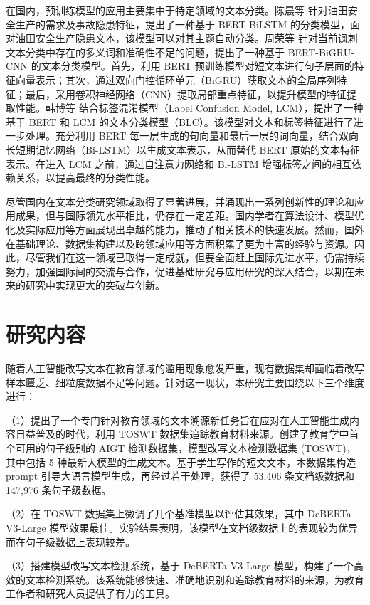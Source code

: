 在国内，预训练模型的应用主要集中于特定领域的文本分类。陈晨等 \cite{KXJS202429028} 针对油田安全生产的需求及事故隐患特征，提出了一种基于 BERT-BiLSTM 的分类模型，面对油田安全生产隐患文本，该模型可以对其主题自动分类。周荣等 \cite{DLXZ20240909001} 针对当前讽刺文本分类中存在的多义词和准确性不足的问题，提出了一种基于 BERT-BiGRU-CNN 的文本分类模型。首先，利用 BERT 预训练模型对短文本进行句子层面的特征向量表示；其次，通过双向门控循环单元（BiGRU）获取文本的全局序列特征；最后，采用卷积神经网络（CNN）提取局部重点特征，以提升模型的特征提取性能。韩博等 \cite{NJYD202403012} 结合标签混淆模型（Label Confusion Model, LCM），提出了一种基于 BERT 和 LCM 的文本分类模型（BLC）。该模型对文本和标签特征进行了进一步处理。充分利用 BERT 每一层生成的句向量和最后一层的词向量，结合双向长短期记忆网络（Bi-LSTM）以生成文本表示，从而替代 BERT 原始的文本特征表示。在进入 LCM 之前，通过自注意力网络和 Bi-LSTM 增强标签之间的相互依赖关系，以提高最终的分类性能。

尽管国内在文本分类研究领域取得了显著进展，并涌现出一系列创新性的理论和应用成果，但与国际领先水平相比，仍存在一定差距。国内学者在算法设计、模型优化及实际应用等方面展现出卓越的能力，推动了相关技术的快速发展。然而，国外在基础理论、数据集构建以及跨领域应用等方面积累了更为丰富的经验与资源。因此，尽管我们在这一领域已取得一定成就，但要全面赶上国际先进水平，仍需持续努力，加强国际间的交流与合作，促进基础研究与应用研究的深入结合，以期在未来的研究中实现更大的突破与创新。

\section{研究内容}
\label{sec:intro-contribution}

随着人工智能改写文本在教育领域的滥用现象愈发严重，现有数据集却面临着改写样本匮乏、细粒度数据不足等问题。针对这一现状，本研究主要围绕以下三个维度进行：

（1）提出了一个专门针对教育领域的文本溯源新任务旨在应对在人工智能生成内容日益普及的时代，利用 TOSWT 数据集追踪教育材料来源。创建了教育学中首个可用的句子级别的 AIGT 检测数据集，模型改写文本检测数据集 (TOSWT)，其中包括 5 种最新大模型的生成文本。基于学生写作的短文文本，本数据集构造 prompt 引导大语言模型生成，再经过若干处理，获得了 53,406 条文档级数据和 147,976 条句子级数据。

（2）在 TOSWT 数据集上微调了几个基准模型以评估其效果，其中 DeBERTa-V3-Large 模型效果最佳。实验结果表明，该模型在文档级数据上的表现较为优异而在句子级数据上表现较差。

（3）搭建模型改写文本检测系统，基于 DeBERTa-V3-Large 模型，构建了一个高效的文本检测系统。该系统能够快速、准确地识别和追踪教育材料的来源，为教育工作者和研究人员提供了有力的工具。

